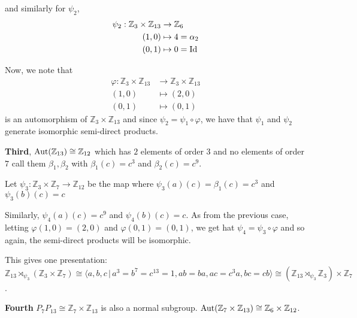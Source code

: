\documentclass[12pt]{Qual}
\begin{document}
\begin{solution}
\begin{enumerate}[label=(\alph*)]
    and similarly for $\psi_2$,  \begin{align*}
        \psi_2:\mathbb{Z}_3\times\mathbb{Z}_{13}&\to\mathbb{Z}_6\\
        (1,0)&\mapsto 4=\alpha_2\\
        (0,1)&\mapsto 0=\text{Id}
    \end{align*}

    Now, we note that \begin{align*}
        \varphi:\mathbb{Z}_3\times\mathbb{Z}_{13}&\to\mathbb{Z}_3\times\mathbb{Z}_{13}\\
        (1,0)&\mapsto (2,0)\\
        (0,1)&\mapsto (0,1)
    \end{align*} is an automorphism of $\mathbb{Z}_3\times\mathbb{Z}_{13}$ and since $\psi_2=\psi_1\circ\varphi$, we have that $\psi_1$ and $\psi_2$ generate isomorphic semi-direct products.


    \textbf{Third}, $\text{Aut}(\mathbb{Z}_{13})\cong\mathbb{Z}_{12}$ which has $2$ elements of order $3$ and no elements of order $7$ call them $\beta_1,\beta_2$ with $\beta_1(c)=c^3$ and $\beta_2(c)=c^9$.

    Let $\psi_3:\mathbb{Z}_3\times\mathbb{Z}_7\to\mathbb{Z}_{12}$ be the map where $\psi_3(a)(c)=\beta_1(c)=c^3$ and $\psi_3(b)(c)=c$

    Similarly, $\psi_4(a)(c)=c^9$ and $\psi_4(b)(c)=c$. As from the previous case, letting $\varphi(1,0)=(2,0)$ and $\varphi(0,1)=(0,1)$, we get hat $\psi_4=\psi_3\circ\varphi$ and so again, the semi-direct products will be isomorphic.

    This gives one presentation: $$\mathbb{Z}_{13}\rtimes_{\psi_3}(\mathbb{Z}_3\times\mathbb{Z}_{7})\cong\langle a,b,c\,|\, a^3=b^7=c^{13}=1, ab=ba, ac=c^3a, bc=cb\rangle\cong (\mathbb{Z}_{13}\rtimes_{\psi_3}\mathbb{Z}_3)\times\mathbb{Z}_{7}$$.

    \textbf{Fourth} $P_7P_{13}\cong\mathbb{Z}_7\times\mathbb{Z}_{13}$ is also a normal subgroup. $\text{Aut}(\mathbb{Z}_7\times\mathbb{Z}_{13})\cong\mathbb{Z}_6\times\mathbb{Z}_{12}$.


\end{enumerate}
\end{solution}
\end{document}
